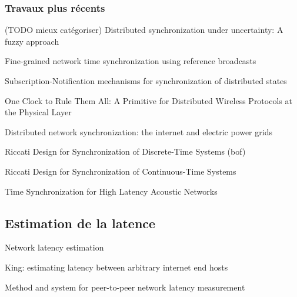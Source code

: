 \subsubsection{Travaux plus récents}
(TODO mieux catégoriser)
Distributed synchronization under uncertainty: A fuzzy approach

Fine-grained network time synchronization using reference broadcasts

Subscription-Notification mechanisms for synchronization of distributed states

One Clock to Rule Them All: A Primitive for Distributed Wireless Protocols at the Physical Layer

Distributed network synchronization: the internet and electric power grids

Riccati Design for Synchronization of Discrete-Time Systems (bof)

Riccati Design for Synchronization of Continuous-Time Systems

Time Synchronization for High Latency Acoustic Networks


\subsection{Estimation de la latence}
\label{section:latence}
Network latency estimation %

King: estimating latency between arbitrary internet end hosts

Method and system for peer-to-peer network latency measurement %

